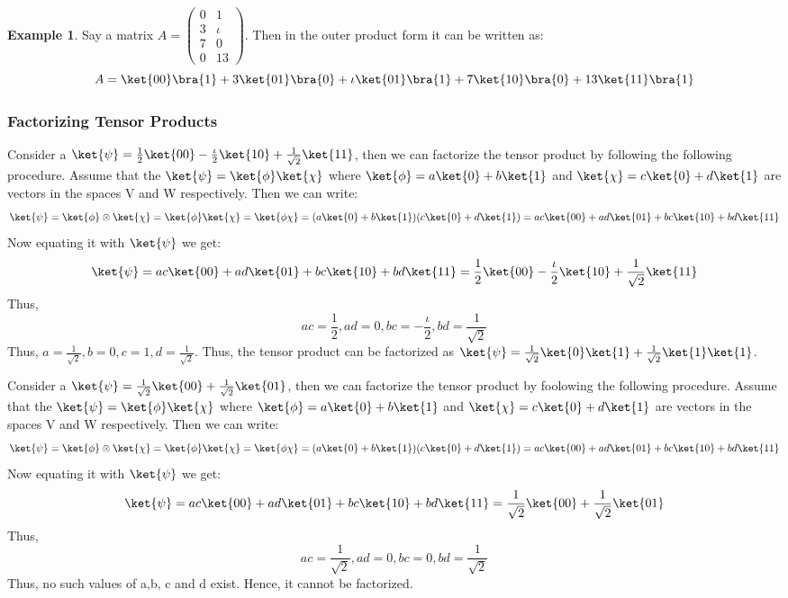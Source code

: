\documentclass[12pt, oneside]{book}
\theoremstyle{definition}
\theoremstyle{definition}
\newtheorem{example}{Example}[section]
\theoremstyle{remark}
\begin{document}
\begin{example}
    Say a matrix $A=\begin{pmatrix} 0 & 1\\3 & \iota \\7 & 0\\0 & 13\end{pmatrix}$. Then in the outer product form it can be written as:
    \[ A = \ket{00}\bra{1} + 3\ket{01}\bra{0} + \iota \ket{01}\bra{1} + 7\ket{10}\bra{0} + 13 \ket{11}\bra{1}\] 
\end{example}

\subsubsection{Factorizing Tensor Products}
Consider a $\ket{\psi}=\frac{1}{2}\ket{00}-\frac{\iota}{2}\ket{10}+\frac{1}{\sqrt{2}}\ket{11}$, then we can factorize the tensor product by following the following procedure.
Assume that the $\ket{\psi}=\ket{\phi}\ket{\chi}$ where $\ket{\phi}=a\ket{0}+b\ket{1}$ and $\ket{\chi}=c\ket{0}+d\ket{1}$ are vectors in the spaces V and W respectively. Then we can write:
\[ \ket{\psi}=\ket{\phi}\otimes \ket{\chi}=\ket{\phi}\ket{\chi}=\ket{\phi\chi}=(a\ket{0}+b\ket{1})(c\ket{0}+d\ket{1})=ac\ket{00}+ad\ket{01}+bc\ket{10}+bd\ket{11} \]
Now equating it with $\ket{\psi}$ we get:
\[ \ket{\psi}=ac\ket{00}+ad\ket{01}+bc\ket{10}+bd\ket{11}=\frac{1}{2}\ket{00}-\frac{\iota}{2}\ket{10}+\frac{1}{\sqrt{2}}\ket{11} \]
Thus,
\[ ac=\frac{1}{2}, ad=0, bc=-\frac{\iota}{2}, bd=\frac{1}{\sqrt{2}} \]
Thus, $a=\frac{1}{\sqrt{2}}, b=0, c=1, d=\frac{1}{\sqrt{2}}$. Thus, the tensor product can be factorized as $\ket{\psi}=\frac{1}{\sqrt{2}}\ket{0}\ket{1}+\frac{1}{\sqrt{2}}\ket{1}\ket{1}$.

Consider a $\ket{\psi}=\frac{1}{\sqrt{2}}\ket{00}+\frac{1}{\sqrt{2}}\ket{01}$, then we can factorize the tensor product by foolowing the following procedure.
Assume that the $\ket{\psi}=\ket{\phi}\ket{\chi}$ where $\ket{\phi}=a\ket{0}+b\ket{1}$ and $\ket{\chi}=c\ket{0}+d\ket{1}$ are vectors in the spaces V and W respectively. Then we can write:
\[ \ket{\psi}=\ket{\phi}\otimes \ket{\chi}=\ket{\phi}\ket{\chi}=\ket{\phi\chi}=(a\ket{0}+b\ket{1})(c\ket{0}+d\ket{1})=ac\ket{00}+ad\ket{01}+bc\ket{10}+bd\ket{11} \]
Now equating it with $\ket{\psi}$ we get:
\[ \ket{\psi}=ac\ket{00}+ad\ket{01}+bc\ket{10}+bd\ket{11}=\frac{1}{\sqrt{2}}\ket{00}+\frac{1}{\sqrt{2}}\ket{01} \]
Thus,
\[ ac=\frac{1}{\sqrt{2}}, ad=0, bc=0, bd=\frac{1}{\sqrt{2}} \]
Thus, no such values of a,b, c and d exist. Hence, it cannot be factorized.
\end{document}
